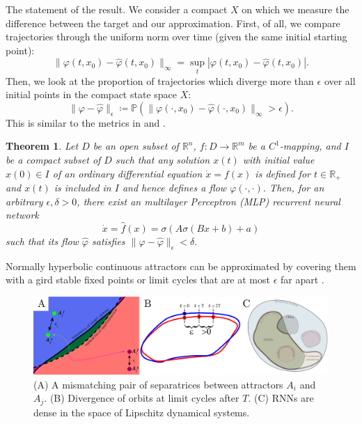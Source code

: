 \documentclass[10pt]{article}
\newtheorem{theorem}{Theorem}
\newcommand{\reals}{\mathbb{R}}
\begin{document}
The statement of the result.
We consider a compact $X$ on which we measure the difference between the target and our approximation.
First, of all, we compare trajectories through the uniform norm over time (given the same initial starting point):
\begin{equation}
\|\varphi(t,x_0)-\hat \varphi(t,x_0)\|_\infty = \sup_t|\varphi(t,x_0)-\hat \varphi(t,x_0)|.
\end{equation}
Then, we look at the proportion of trajectories which diverge more than $\epsilon$ over all initial points in the compact state space $X$:
\begin{equation}
\|\varphi-\hat \varphi\|_\epsilon \coloneqq  \mathbb{P}\left(\|\varphi(\cdot,x_0)-\hat \varphi(\cdot,x_0)\|_\infty>\epsilon\right).
\end{equation}
This is similar to the metrics in \citep{hammer2000approximation} and \citep{hanson2021learning}.
\begin{theorem}
Let $D$ be an open subset of $\mathbb{R}^n$, $f\colon D \to \mathbb{R}^m$ be a $C^1$-mapping, and $I$ be a compact subset of $D$ such that any solution $x(t)$ with initial value $x(0) \in I$ of an ordinary differential equation $\dot{x} = f(x)$ is defined for $t\in\reals_{+}$ and $x(t)$ is included in $I$ and hence defines a flow $\varphi(\cdot, \cdot)$.
 Then, for an arbitrary $\epsilon, \delta > 0$, there exist an multilayer Perceptron (MLP) recurrent neural network 
 \begin{equation}
\dot x = \hat f(x) = \sigma(A\sigma(Bx+b)+a)
\end{equation}
such that its flow $\hat \varphi$ satisfies $\|\varphi-\hat \varphi\|_\epsilon < \delta.$
\end{theorem}

Normally hyperbolic continuous attractors can be approximated by covering them with a gird stable fixed points or limit cycles that are at most $\epsilon$ far apart \citep{Sagodi2024a}.

\begin{figure}[tbhp]
  \centering
  \includegraphics[width=\textwidth]{icmns2025_figure}
  \caption{(A) 	A mismatching pair of separatrices between attractors $A_i$ and $A_j$.
  		(B) Divergence of orbits at limit cycles after $T$.
  		(C) RNNs are dense in the space of Lipschitz dynamical systems.
  }\label{fig:figure}
\end{figure}



\end{document}
